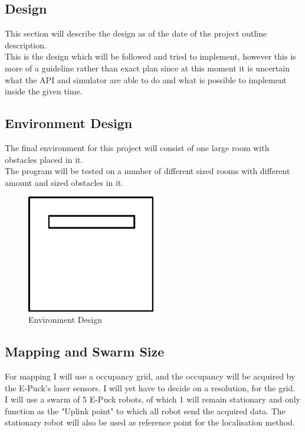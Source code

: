 \begin{flushleft}

\chapter{Design}
\label{Design}

This section will describe the design as of the date of the project outline description. \\
This is the design which will be followed and tried to implement, however this is more of a guideline rather than exact plan since at this moment it is uncertain what the  API and simulator are able to do and what is possible to implement inside the given time.\\

\section{Environment Design}
The final environment for this project will consist of one large room with obstacles placed in it. \\
The program will be tested on a number of different sized rooms with different amount and sized obstacles in it.


\begin{figure}[h]
\centering
\includegraphics[width=0.5\textwidth]{../../figures/environment_example2.png} 
\caption{Environment Design}
\label{Figure 2}
\end{figure}

\section{Mapping and Swarm Size}
For mapping I will use a occupancy grid, and the occupancy will be acquired by the E-Puck's laser sensors. 
I will yet have to decide on a resolution, for the grid.\\
I will use a swarm of 5 E-Puck robots, of which 1 will remain stationary and only function as the "Uplink point" to which all robot send the acquired data. 
The stationary robot will also be used as reference point for the localisation method.


\end{flushleft}
